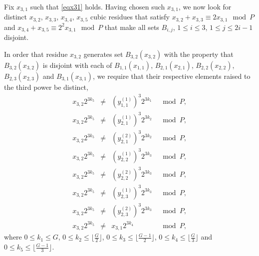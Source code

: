 \documentclass[12pt]{article} \pagestyle{plain} \topmargin
\begin{document}
Fix $x_{3,1}$ such that \eqref{eqx31} holds. Having chosen such
$x_{3,1}$, we now look for distinct $x_{3,2}$, $x_{3,3}$,
$x_{3,4}$, $x_{3,5}$ cubic residues that satisfy $x_{3,2}+x_{3,3}
\equiv 2x_{3,1} \mod P$ and $x_{3,4}+x_{3,5} \equiv 2^2x_{3,1}
\mod P$ that make all sets $B_{i,j}$, $1 \leq i \leq 3$, $1 \leq j
\leq 2i-1$ disjoint.

In order that residue $x_{3,2}$ generates set $B_{3,2}(x_{3,2})$
with the property that $B_{3,2}(x_{3,2})$ is disjoint with each of
$B_{1,1}(x_{1,1})$, $B_{2,1}(x_{2,1})$, $B_{2,2}(x_{2,2})$,
$B_{2,3}(x_{2,3})$ and $B_{3,1}(x_{3,1})$, we require that their
respective elements raised to the third power be distinct,
\begin{equation}\label{eqx32}\begin{array}{cccc}
x_{3,2}2^{3k_5} &\neq& (y_{1,1}^{(1)})^3 2^{3k_1} &\mod P, \\
x_{3,2}2^{3k_5} &\neq& (y_{2,1}^{(1)})^3 2^{3k_2} &\mod P, \\
x_{3,2}2^{3k_5} &\neq& (y_{2,1}^{(2)})^3 2^{3k_2} &\mod P, \\
x_{3,2}2^{3k_5} &\neq& (y_{2,2}^{(1)})^3 2^{3k_3} &\mod P, \\
x_{3,2}2^{3k_5} &\neq& (y_{2,2}^{(2)})^3 2^{3k_3} &\mod P, \\
x_{3,2}2^{3k_5} &\neq& (y_{2,3}^{(1)})^3 2^{3k_3} &\mod P, \\
x_{3,2}2^{3k_5} &\neq& (y_{2,3}^{(2)})^3 2^{3k_3} &\mod P, \\
x_{3,2}2^{3k_5} &\neq& x_{3,1} 2^{3k_4} &\mod P,
\end{array}\end{equation}
where $0 \leq k_1 \leq G$, $0 \leq k_2 \leq \lfloor \frac{G}{2}
\rfloor$, $0 \leq k_3 \leq \lfloor\frac{G-1}{2} \rfloor$, $0 \leq
k_4 \leq \lfloor\frac{G}{3} \rfloor$ and $0 \leq k_5 \leq
\lfloor\frac{G-1}{3} \rfloor$.
\end{document}
